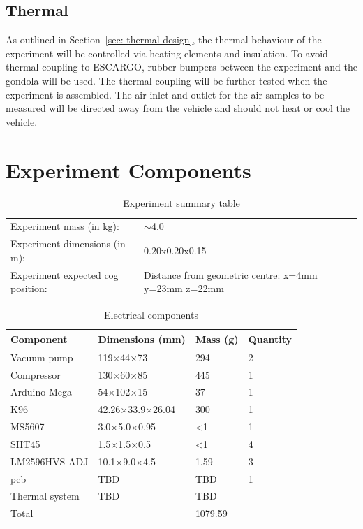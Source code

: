 \documentclass[
  a4paper,
  11pt,
  openany,
  parskip,
  toc=totoc,
  listof=totoc,
  bibliography=totoc
]{scrreprt}
\newcommand{\sref}[1]{Section~\ref{#1}}
\begin{document}
\subsection{Thermal}\label{thermal}
As outlined in \sref{sec: thermal design}, the thermal behaviour of the experiment will be controlled via heating elements and insulation. To avoid thermal coupling to ESCARGO, rubber bumpers between the experiment and the gondola will be used.
The thermal coupling will be further tested when the experiment is assembled. The air inlet and outlet for the air samples to be measured will be directed away from the vehicle and should not heat or cool the vehicle.

\section{Experiment Components}

\begin{table}[H]
\centering
\caption{Experiment summary table}
\label{tab:experiment_summary}
\begin{tabular}{L{6cm}L{6cm}}
\toprule
Experiment mass (in kg): & $\sim$4.0 \\
Experiment dimensions (in m): & 0.20x0.20x0.15\\
Experiment expected \gls{cog} position: & Distance from geometric centre: x=4mm y=23mm z=22mm \\
\bottomrule
\end{tabular}
\end{table}

\begin{table}[H]
\centering
\caption{Electrical components}
\label{tab:electrical_components}
\begin{tabular}{p{4cm}p{4cm}ll}
\hline
\textbf{Component} & \textbf{Dimensions (mm)} & \textbf{Mass (g)} & \textbf{Quantity}\\
\hline
Vacuum pump & 119$\times$44$\times$73 & 294 & 2 \\
Compressor & 130$\times$60$\times$85 & 445 & 1 \\
Arduino Mega & 54$\times$102$\times$15 & 37 & 1\\
K96 & 42.26$\times$33.9$\times$26.04 & 300 & 1 \\
MS5607 & 3.0$\times$5.0$\times$0.95 & <1 & 1\\
SHT45 & 1.5$\times$1.5$\times$0.5 & <1 & 4 \\
LM2596HVS-ADJ & 10.1$\times$9.0$\times$4.5 & 1.59 & 3 \\
\gls{pcb} & TBD & TBD & 1 \\
Thermal system & TBD & TBD &  \\
\hline
Total & & 1079.59 & \\
\hline
\end{tabular}
\end{table}
\end{document}
